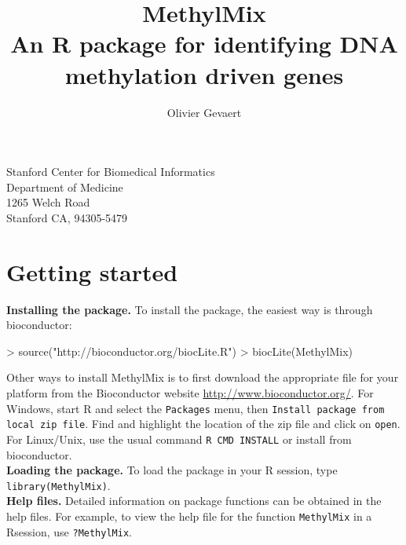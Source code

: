 \documentclass[11pt]{article}
\begin{document}


\title{MethylMix\\ An R package for identifying DNA methylation driven genes}
\author{Olivier Gevaert}
\maketitle
\begin{center}
Stanford Center for Biomedical Informatics\\
Department of Medicine\\
1265 Welch Road\\
Stanford CA, 94305-5479\\
\end{center}


\section{Getting started}

{\bf Installing the package.} To install the  package, 
the easiest way is through bioconductor: \\

\begin{Schunk}
\begin{Sinput}
> source("http://bioconductor.org/biocLite.R")
> biocLite(MethylMix)
\end{Sinput}
\end{Schunk}
Other ways to install MethylMix is to first download the appropriate file for 
your platform from the Bioconductor website \url{http://www.bioconductor.org/}. 
For Windows, start R and select the \texttt{Packages} menu, then \texttt{Install 
package from local zip file}.  Find and highlight the location of the zip file 
and click on {\tt open}. For Linux/Unix, use the usual command \texttt{R 
CMD INSTALL} or install from bioconductor.\\

{\bf Loading the package.} To load the  package in your R 
session, type \texttt{library(MethylMix)}.\\

{\bf Help files.}  Detailed information on  package 
functions can be obtained in the help files. For example, to view the help file 
for the function \texttt{MethylMix} in a Rsession, use \texttt{?MethylMix}.\\
\end{document}
